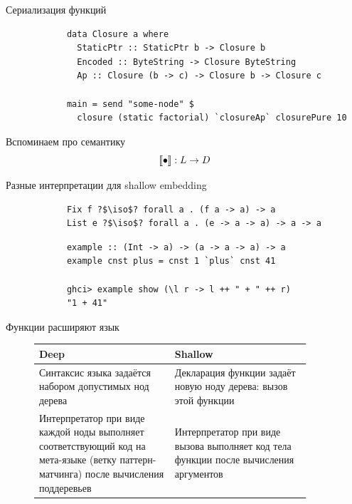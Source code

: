     \begin{frame}[fragile]{Сериализация функций}
        \pause
        \begin{verbatim}
            data Closure a where
              StaticPtr :: StaticPtr b -> Closure b
              Encoded :: ByteString -> Closure ByteString
              Ap :: Closure (b -> c) -> Closure b -> Closure c

            main = send "some-node" $
              closure (static factorial) `closureAp` closurePure 10
        \end{verbatim}
    \end{frame}


    \begin{frame}[fragile]{Вспоминаем про семантику}
        \pause
        \[
            \llbracket{\bullet}\rrbracket : L \to D
        \]
    \end{frame}

    \begin{frame}[fragile]{Разные интерпретации для shallow embedding}
        \pause
        \begin{verbatim}
            Fix f ?$\iso$? forall a . (f a -> a) -> a
            List e ?$\iso$? forall a . (e -> a -> a) -> a -> a
        \end{verbatim}
        \pause\vspace{1em}
        \begin{verbatim}
            example :: (Int -> a) -> (a -> a -> a) -> a
            example cnst plus = cnst 1 `plus` cnst 41

            ghci> example show (\l r -> l ++ " + " ++ r)
            "1 + 41"
        \end{verbatim}
    \end{frame}

    \begin{frame}[fragile]{Функции расширяют язык}
        \pause
        \begin{figure}[h]
            \centering
            \begin{tabular}{|p{0.45\linewidth}|p{0.45\linewidth}|}
                \hline
                Deep                                                                                                                                 & Shallow                                                                              \\
                \hline
                Синтаксис языка задаётся набором допустимых нод дерева                                                                               & Декларация функции задаёт новую ноду дерева: вызов этой функции                      \\
                \hline
                Интерпретатор при виде каждой ноды выполняет соответствующий код на мета-языке (ветку паттерн-матчинга) после вычисления поддеревьев & Интерпретатор при виде вызова выполняет код тела функции после вычисления аргументов \\
                \hline
            \end{tabular}
        \end{figure}
    \end{frame}

